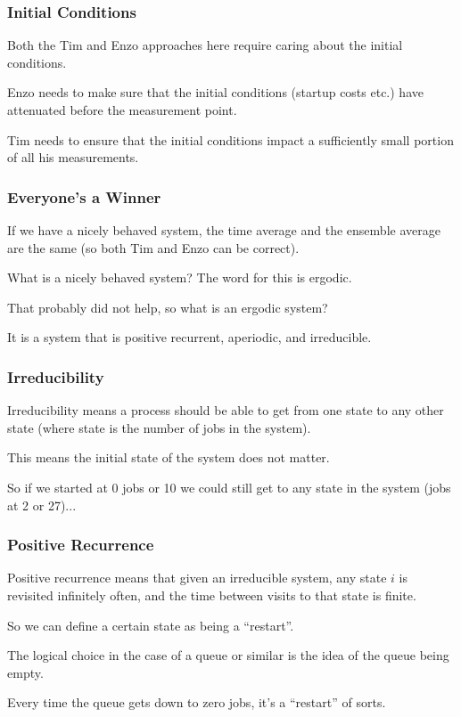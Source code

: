 \begin{frame}
\frametitle{Initial Conditions}

Both the Tim and Enzo approaches here require caring about the initial conditions. 

Enzo needs to make sure that the initial conditions (startup costs etc.) have attenuated before the measurement point. 

Tim needs to ensure that the initial conditions impact a sufficiently small portion of all his measurements.

\end{frame}



\begin{frame}
\frametitle{Everyone's a Winner}

If we have a nicely behaved system, the time average and the ensemble average are the same (so both Tim and Enzo can be correct). 

What is a nicely behaved system? The word for this is \alert{ergodic}. 

That probably did not help, so what is an ergodic system? 

It is a system that is positive recurrent, aperiodic, and irreducible.

\end{frame}



\begin{frame}
\frametitle{Irreducibility}

\alert{Irreducibility} means a process should be able to get from one state to any other state (where state is the number of jobs in the system). 

This means the initial state of the system does not matter. 

So if we started at 0 jobs or 10 we could still get to any state in the system (jobs at 2 or 27)...

\end{frame}



\begin{frame}
\frametitle{Positive Recurrence}

\alert{Positive recurrence} means that given an irreducible system, any state $i$ is revisited infinitely often, and the time between visits to that state is finite. 

So we can define a certain state as being a ``restart''. 

The logical choice in the case of a queue or similar is the idea of the queue being empty. 

Every time the queue gets down to zero jobs, it's a ``restart'' of sorts. 

\end{frame}



